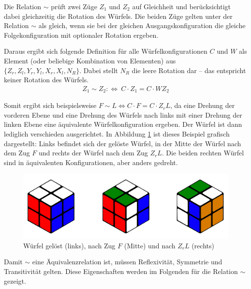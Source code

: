 \documentclass[12pt,a4paper, usenames, dvipsnames]{article}
\theoremstyle{mystyle}
\theoremstyle{definition}
\begin{document}
Die Relation $\sim$ prüft zwei Züge $Z_1$ und $Z_2$ auf Gleichheit und berücksichtigt dabei gleichzeitig die Rotation des Würfels. Die beiden Züge gelten unter der Relation $\sim$ als gleich, wenn sie bei der gleichen Ausgangskonfiguration die gleiche Folgekonfiguration mit optionaler Rotation ergeben.

Daraus ergibt sich folgende Definition für alle Würfelkonfigurationen $C$ und $W$ als Element (oder beliebige Kombination von Elementen) aus $\{{Z_r}, {Z_l}, {Y_r}, {Y_l}, {X_r}, {X_l}, N_R\}$. Dabei stellt $N_R$ die leere Rotation dar -- das entspricht keiner Rotation des Würfels. 
\begin{align*}
Z_1 \sim Z_2 :\Leftrightarrow \ C \cdot Z_1 = C \cdot WZ_2
\end{align*}

Somit ergibt sich beispielsweise $F \sim L \Leftrightarrow C \cdot F = C \cdot Z_rL$, da eine Drehung der vorderen Ebene und eine Drehung des Würfels nach links mit einer Drehung der linken Ebene eine äquivalente Würfelkonfiguration ergeben. Der Würfel ist dann lediglich verschieden ausgerichtet. 
In Abbildung \ref{Abbildung_GelöstnachFnachZL} ist dieses Beispiel grafisch dargestellt: Links befindet sich der gelöste Würfel, in der Mitte der Würfel nach dem Zug $F$ und rechts der Würfel nach dem Zug $Z_rL$. Die beiden rechten Würfel sind in äquivalenten Konfigurationen, aber anders gedreht.
\begin{figure}[h]
\centering
\includegraphics[scale=0.15]{3_wuerfel.png}
\caption[Würfel gelöst, nach Zug $F$ und nach $Z_rL$]{Würfel gelöst (links), nach Zug $F$ (Mitte) und nach $Z_rL$ (rechts)}
\label{Abbildung_GelöstnachFnachZL}
\end{figure}

Damit $\sim$ eine Äquivalenzrelation ist, müssen Reflexivität, Symmetrie und Transitivität gelten. Diese Eigenschaften werden im Folgenden für die Relation $\sim$ gezeigt.
\end{document}
